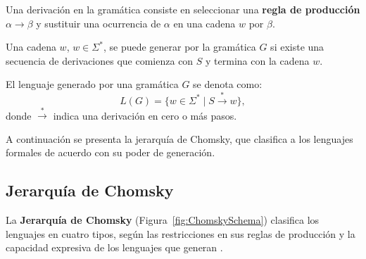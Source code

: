 Una derivación en la gramática consiste en seleccionar una \textbf{regla de producción} $\alpha \to \beta$ y sustituir una ocurrencia de 
$\alpha$ en una cadena $w$ por $\beta$.

Una cadena $w$, $w\in\Sigma^*$,  se puede generar por la gramática $G$ si existe una secuencia de derivaciones que comienza con $S$
y termina con la cadena $w$.

El lenguaje generado por una gramática \(G\) se denota como:
\[
      L(G) = \{ w \in \Sigma^* \mid S \overset{*}{\to} w \},
\]
donde \(\overset{*}{\to}\) indica una derivación en cero o más pasos.

A continuación se presenta la jerarquía de Chomsky, que clasifica a los lenguajes formales de acuerdo con su poder de generación.

\subsection{Jerarquía de Chomsky}

La \textbf{Jerarquía de Chomsky} (Figura~\ref{fig:ChomskySchema}) clasifica los lenguajes en cuatro tipos, según las restricciones en sus reglas de producción y la capacidad expresiva de los lenguajes que generan \cite{geeksforgeeks_chomsky_hierarchy}.

